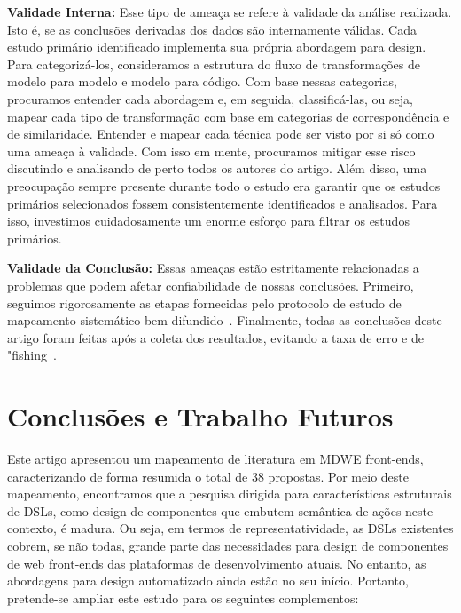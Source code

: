 \textbf{Validade Interna:} 
Esse tipo de ameaça se refere à validade da análise realizada. Isto é, se as conclusões derivadas dos dados são internamente válidas. Cada estudo primário identificado implementa sua própria abordagem para design. Para categorizá-los, consideramos a estrutura do fluxo de transformações de modelo para modelo e modelo para código. Com base nessas categorias, procuramos entender cada abordagem e, em seguida, classificá-las, ou seja, mapear cada tipo de transformação com base em categorias de correspondência e de similaridade. Entender e mapear cada técnica pode ser visto por si só como uma ameaça à validade. Com isso em mente, procuramos mitigar esse risco discutindo e analisando de perto todos os autores do artigo. Além disso, uma preocupação sempre presente durante todo o estudo era garantir que os estudos primários selecionados fossem consistentemente identificados e analisados. Para isso, investimos cuidadosamente um enorme esforço para filtrar os estudos primários.

\textbf{Validade da Conclusão:} 
Essas ameaças estão estritamente relacionadas a problemas que podem afetar
confiabilidade de nossas conclusões. Primeiro, seguimos rigorosamente as etapas fornecidas pelo protocolo de estudo de mapeamento sistemático bem difundido~\cite{Kitchenham07}. %
Finalmente, todas as conclusões deste artigo foram feitas após a coleta dos resultados, evitando a taxa de erro e de "fishing~\cite{Kitchenham07}.




\section{Conclusões e Trabalho Futuros}
\label{sec:conclusions}

Este artigo apresentou um mapeamento de literatura em MDWE front-ends, caracterizando de forma resumida o total de 38 propostas. Por meio deste mapeamento, encontramos que a pesquisa dirigida para características estruturais de DSLs, como design de componentes que embutem semântica de ações neste contexto, é madura. Ou seja, em termos de representatividade, as DSLs existentes cobrem, se não todas, grande parte das necessidades para design de componentes de web front-ends das plataformas de desenvolvimento atuais. No entanto, as abordagens para design automatizado ainda estão no seu início. Portanto, pretende-se ampliar este estudo para os seguintes complementos:



